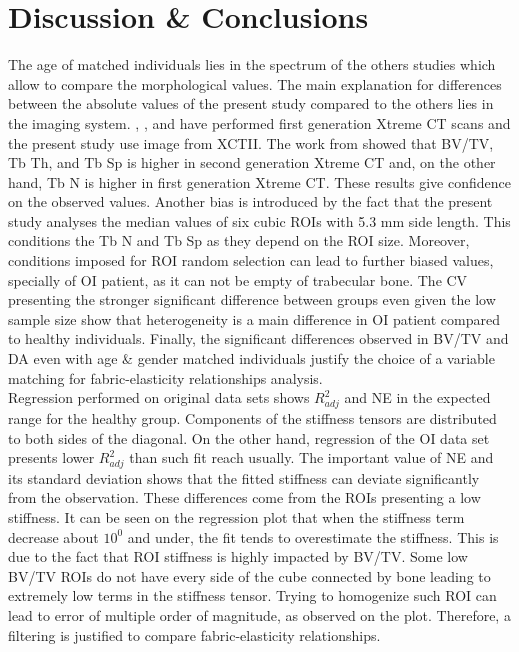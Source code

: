 \documentclass[a4paper,fleqn]{DC_ArtStyle}
\begin{document}
\section{Discussion \& Conclusions}
The age of matched individuals lies in the spectrum of the others studies which allow to compare the morphological values. The main explanation for differences between the absolute values of the present study compared to the others lies in the imaging system. \citeauthor{Folkestad2012}\cite{Folkestad2012}, \citeauthor{Kocijan2015}\cite{Kocijan2015}, and \citeauthor{Rolvien2018}\cite{Rolvien2018} have performed first generation Xtreme CT scans and the present study use image from XCTII. The work from \citeauthor{Agarwal2016}\cite{Agarwal2016} showed that BV/TV, Tb Th, and Tb Sp is higher in second generation Xtreme CT and, on the other hand, Tb N is higher in first generation Xtreme CT. These results give confidence on the observed values. Another bias is introduced by the fact that the present study analyses the median values of six cubic ROIs with 5.3 mm side length. This conditions the Tb N and Tb Sp as they depend on the ROI size. Moreover, conditions imposed for ROI random selection can lead to further biased values, specially of OI patient, as it can not be empty of trabecular bone. The CV presenting the stronger significant difference between groups even given the low sample size show that heterogeneity is a main difference in OI patient compared to healthy individuals. Finally, the significant differences observed in BV/TV and DA even with age \& gender matched individuals justify the choice of a variable matching for fabric-elasticity relationships analysis.\\

Regression performed on original data sets shows $R^2_{adj}$ and NE in the expected range for the healthy group. Components of the stiffness tensors are distributed to both sides of the diagonal. On the other hand, regression of the OI data set presents lower $R^2_{adj}$ than such fit reach usually. The important value of NE and its standard deviation shows that the fitted stiffness can deviate significantly from the observation. These differences come from the ROIs presenting a low stiffness. It can be seen on the regression plot that when the stiffness term decrease about $10^0$ and under, the fit tends to overestimate the stiffness. This is due to the fact that ROI stiffness is highly impacted by BV/TV. Some low BV/TV ROIs do not have every side of the cube connected by bone leading to extremely low terms in the stiffness tensor. Trying to homogenize such ROI can lead to error of multiple order of magnitude, as observed on the plot. Therefore, a filtering is justified to compare fabric-elasticity relationships.\\
\end{document}
